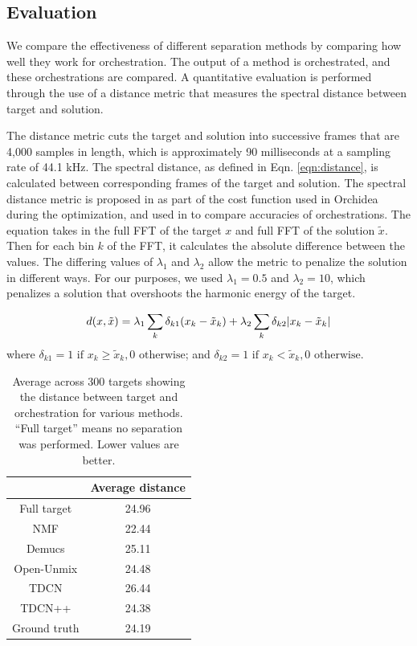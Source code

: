 \documentclass{article}
\begin{document}
		\subsection{Evaluation}
		We compare the effectiveness of different separation methods by comparing how well they work for orchestration. The output of a method is orchestrated, and these orchestrations are compared. A quantitative evaluation is performed through the use of a distance metric that measures the spectral distance between target and solution. 
		
		The distance metric cuts the target and solution into successive frames that are 4,000 samples in length, which is approximately 90 milliseconds at a sampling rate of 44.1 kHz. The spectral distance, as defined in Eqn. \ref{eqn:distance}, is calculated between corresponding frames of the target and solution. The spectral distance metric is proposed in \cite{Cella2020} as part of the cost function used in Orchidea during the optimization, and used in \cite{Cella2020b} to compare accuracies of orchestrations. The equation takes in the full FFT of the target $x$ and full FFT of the solution $\tilde{x}$. Then for each bin $k$ of the FFT, it calculates the absolute difference between the values. The differing values of $\lambda_1$ and $\lambda_2$ allow the metric to penalize the solution in different ways. For our purposes, we used $\lambda_1 = 0.5$ and $\lambda_2 = 10$, which penalizes a solution that overshoots the harmonic energy of the target.
		
		\begin{equation}\label{eqn:distance}
d(x, \tilde{x}) =\lambda_1 \sum_k \delta_{k1}(x_k - \tilde{x}_k) + \lambda_2 \sum_k \delta_{k2}|x_k - \tilde{x	}_k| \\
\end{equation}
where $\delta_{k1} = 1 \text{  if  } x_k \ge \tilde{x}_k, 0 \text{  otherwise}$; and $\delta_{k2} = 1 \text{  if  } x_k < \tilde{x}_k, 0 \text{  otherwise}$.
	
	
	\begin{table}[t]
		\begin{center}
			\begin{tabular}{|c|c|}
				\hline
				& Average distance \\
				\hline
				Full target & 24.96 \\
				\hline
				NMF & 22.44 \\
				\hline
				Demucs & 25.11 \\
				\hline
				Open-Unmix & 24.48\\
				\hline
				TDCN & 26.44\\
				\hline
				TDCN++ & 24.38 \\
				\hline
				Ground truth & 24.19 \\
				\hline
			\end{tabular}
		\end{center}
		\caption{Average across 300 targets showing the distance between target and orchestration for various methods. ``Full target'' means no separation was performed. Lower values are better.}
		\label{tab:distances}
	\end{table}
		
\end{document}
